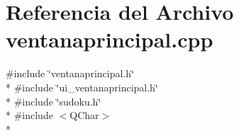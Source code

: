 \section{Referencia del Archivo ventanaprincipal.\-cpp}
\label{ventanaprincipal_8cpp}
{\ttfamily \#include \char`\"{}ventanaprincipal.\-h\char`\"{}}\\*
{\ttfamily \#include \char`\"{}ui\-\_\-ventanaprincipal.\-h\char`\"{}}\\*
{\ttfamily \#include \char`\"{}sudoku.\-h\char`\"{}}\\*
{\ttfamily \#include $<$Q\-Char$>$}\\*

